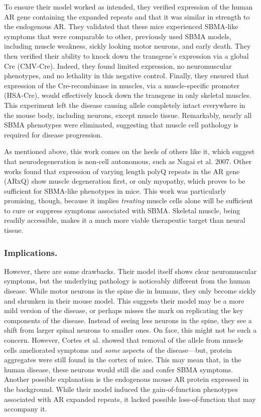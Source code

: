 To ensure their model worked as intended, they verified expression of the human AR gene containing the expanded repeats and that it was similar in strength to the endogenous AR. They validated that these mice experienced SBMA-like symptoms that were comparable to other, previously used SBMA models, including muscle weakness, sickly looking motor neurons, and early death. They then verified their ability to knock down the transgene's expression via a global Cre (CMV-Cre). Indeed, they found limited expression, no neuromuscular phenotypes, and no lethality in this negative control. Finally, they ensured that expression of the Cre-recombinase in muscles, via a muscle-specific promoter (HSA-Cre), would effectively knock down the transgene in only skeletal muscles. This experiment left the disease causing allele completely intact everywhere in the mouse body, including neurons, except muscle tissue. Remarkably,  nearly all SBMA phenotypes were eliminated, suggesting that muscle cell pathology is required for disease progression.\newline

As mentioned above, this work comes on the heels of others like it, which suggest that neurodegeneration is non-cell autonomous, such as Nagai et al. 2007. Other works found that expression of varying length polyQ repeats in the AR gene (ARxQ) show muscle degeneration first, or only myopathy, which proves to be sufficient for SBMA-like phenotypes in mice. This work was particularly promising, though, because it implies \textit{treating} muscle cells alone will be sufficient to cure or suppress symptoms associated with SBMA. Skeletal muscle, being readily accessible, makes it a much more viable therapeutic target than neural tissue.

\subsubsection*{Implications.}
    
However, there are some drawbacks. Their model itself shows clear neuromuscular symptoms, but the underlying pathology is noticeably different from the human disease. While motor neurons in the spine die in humans, they only become sickly and shrunken in their mouse model. This suggests their model may be a more mild version of the disease, or perhaps misses the mark on replicating the key components of the disease. Instead of seeing less neurons in the spine, they see a shift from larger spinal neurons to smaller ones. On face, this might not be such a concern. However, Cortes et al. showed that removal of the allele from muscle cells ameliorated symptoms and \textit{some} aspects of the disease---but, protein aggregates were still found in the cortex of mice. This may mean that, in the human disease, these neurons would still die and confer SBMA symptoms. Another possible explanation is the endogenous mouse AR protein expressed in the background. While their model induced the gain-of-function phenotypes associated with AR expanded repeats, it lacked possible loss-of-function that may accompany it.\newline

